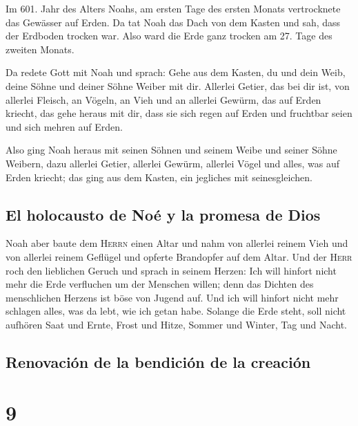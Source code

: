  Im 601. Jahr des Alters Noahs, am ersten Tage des ersten
Monats vertrocknete das Gewässer auf Erden. Da tat Noah das Dach von dem
Kasten und sah, dass der Erdboden trocken war.  Also ward
die Erde ganz trocken am 27. Tage des zweiten Monats.

 Da redete Gott mit Noah und sprach:  Gehe
aus dem Kasten, du und dein Weib, deine Söhne und deiner Söhne Weiber
mit dir.  Allerlei Getier, das bei dir ist, von allerlei
Fleisch, an Vögeln, an Vieh und an allerlei Gewürm, das auf Erden
kriecht, das gehe heraus mit dir, dass sie sich regen auf Erden und
fruchtbar seien und sich mehren auf Erden.

 Also ging Noah heraus mit seinen Söhnen und seinem Weibe
und seiner Söhne Weibern,  dazu allerlei Getier, allerlei
Gewürm, allerlei Vögel und alles, was auf Erden kriecht; das ging aus
dem Kasten, ein jegliches mit seinesgleichen.

\hypertarget{el-holocausto-de-nouxe9-y-la-promesa-de-dios}{%
\subsection{El holocausto de Noé y la promesa de
Dios}\label{el-holocausto-de-nouxe9-y-la-promesa-de-dios}}

 Noah aber baute dem \textsc{Herrn} einen Altar und nahm
von allerlei reinem Vieh und von allerlei reinem Geflügel und opferte
Brandopfer auf dem Altar.  Und der \textsc{Herr} roch den
lieblichen Geruch und sprach in seinem Herzen: Ich will hinfort nicht
mehr die Erde verfluchen um der Menschen willen; denn das Dichten des
menschlichen Herzens ist böse von Jugend auf. Und ich will hinfort nicht
mehr schlagen alles, was da lebt, wie ich getan habe. 
Solange die Erde steht, soll nicht aufhören Saat und Ernte, Frost und
Hitze, Sommer und Winter, Tag und Nacht.

\hypertarget{renovaciuxf3n-de-la-bendiciuxf3n-de-la-creaciuxf3n}{%
\subsection{Renovación de la bendición de la
creación}\label{renovaciuxf3n-de-la-bendiciuxf3n-de-la-creaciuxf3n}}

\hypertarget{section-8}{%
\section{9}\label{section-8}}

